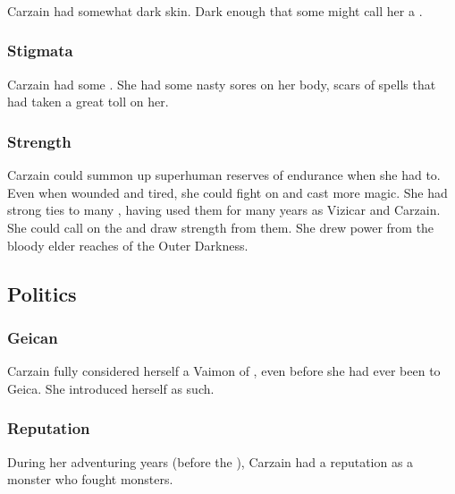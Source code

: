 \subsubsection{\Demihuman}
Carzain had somewhat dark skin. 
Dark enough that some might call her a \demihuman.





\subsubsection{Stigmata}
Carzain had some . 
She had some nasty sores on her body, scars of spells that had taken a great toll on her. 





\subsubsection{Strength}
Carzain could summon up superhuman reserves of endurance when she had to. 
Even when wounded and tired, she could fight on and cast more magic. 
She had strong ties to many \qliphoth, having used them for many years as Vizicar and Carzain. 
She could call on the \qliphoth and draw strength from them. 
She drew power from the bloody elder reaches of the Outer Darkness. 









\subsection{Politics}





\subsubsection{Geican}
Carzain fully considered herself a Vaimon of \ClanGeican, even before she had ever been to Geica.
She introduced herself as such. 





\subsubsection{Reputation}
During her adventuring years (before the ), Carzain had a reputation as a monster who fought monsters. 

